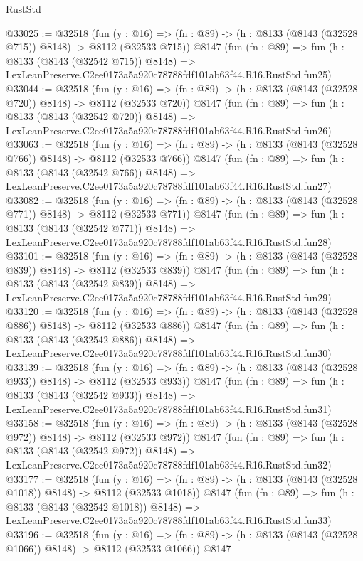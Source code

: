 \begin{lexlean}{RustStd}
\begin{coremodule}
@33025 := @32518
    (fun (y : @16) => (fn : @89) -> (h : @8133 (@8143 (@32528 @715)) @8148) -> @8112 (@32533 @715))
    @8147
    (fun (fn : @89) =>
    fun (h : @8133 (@8143 (@32542 @715)) @8148) =>
    LexLeanPreserve.C2ee0173a5a920c78788fdf101ab63f44.R16.RustStd.fun25)
@33044 := @32518
    (fun (y : @16) => (fn : @89) -> (h : @8133 (@8143 (@32528 @720)) @8148) -> @8112 (@32533 @720))
    @8147
    (fun (fn : @89) =>
    fun (h : @8133 (@8143 (@32542 @720)) @8148) =>
    LexLeanPreserve.C2ee0173a5a920c78788fdf101ab63f44.R16.RustStd.fun26)
@33063 := @32518
    (fun (y : @16) => (fn : @89) -> (h : @8133 (@8143 (@32528 @766)) @8148) -> @8112 (@32533 @766))
    @8147
    (fun (fn : @89) =>
    fun (h : @8133 (@8143 (@32542 @766)) @8148) =>
    LexLeanPreserve.C2ee0173a5a920c78788fdf101ab63f44.R16.RustStd.fun27)
@33082 := @32518
    (fun (y : @16) => (fn : @89) -> (h : @8133 (@8143 (@32528 @771)) @8148) -> @8112 (@32533 @771))
    @8147
    (fun (fn : @89) =>
    fun (h : @8133 (@8143 (@32542 @771)) @8148) =>
    LexLeanPreserve.C2ee0173a5a920c78788fdf101ab63f44.R16.RustStd.fun28)
@33101 := @32518
    (fun (y : @16) => (fn : @89) -> (h : @8133 (@8143 (@32528 @839)) @8148) -> @8112 (@32533 @839))
    @8147
    (fun (fn : @89) =>
    fun (h : @8133 (@8143 (@32542 @839)) @8148) =>
    LexLeanPreserve.C2ee0173a5a920c78788fdf101ab63f44.R16.RustStd.fun29)
@33120 := @32518
    (fun (y : @16) => (fn : @89) -> (h : @8133 (@8143 (@32528 @886)) @8148) -> @8112 (@32533 @886))
    @8147
    (fun (fn : @89) =>
    fun (h : @8133 (@8143 (@32542 @886)) @8148) =>
    LexLeanPreserve.C2ee0173a5a920c78788fdf101ab63f44.R16.RustStd.fun30)
@33139 := @32518
    (fun (y : @16) => (fn : @89) -> (h : @8133 (@8143 (@32528 @933)) @8148) -> @8112 (@32533 @933))
    @8147
    (fun (fn : @89) =>
    fun (h : @8133 (@8143 (@32542 @933)) @8148) =>
    LexLeanPreserve.C2ee0173a5a920c78788fdf101ab63f44.R16.RustStd.fun31)
@33158 := @32518
    (fun (y : @16) => (fn : @89) -> (h : @8133 (@8143 (@32528 @972)) @8148) -> @8112 (@32533 @972))
    @8147
    (fun (fn : @89) =>
    fun (h : @8133 (@8143 (@32542 @972)) @8148) =>
    LexLeanPreserve.C2ee0173a5a920c78788fdf101ab63f44.R16.RustStd.fun32)
@33177 := @32518
    (fun (y : @16) =>
    (fn : @89) -> (h : @8133 (@8143 (@32528 @1018)) @8148) -> @8112 (@32533 @1018))
    @8147
    (fun (fn : @89) =>
    fun (h : @8133 (@8143 (@32542 @1018)) @8148) =>
    LexLeanPreserve.C2ee0173a5a920c78788fdf101ab63f44.R16.RustStd.fun33)
@33196 := @32518
    (fun (y : @16) =>
    (fn : @89) -> (h : @8133 (@8143 (@32528 @1066)) @8148) -> @8112 (@32533 @1066))
    @8147

\end{coremodule}
\end{lexlean}
